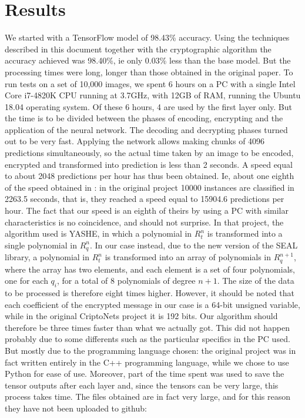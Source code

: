 \section{Results}

We started with a TensorFlow model of 98.43\% accuracy. Using the techniques described in this document together with the cryptographic algorithm the accuracy achieved was 98.40\%, ie only 0.03\% less than the base model. But the processing times were long, longer than those obtained in the original paper. To run tests on a set of 10,000 images, we spent 6 hours on a PC with a single Intel Core i7-4820K CPU running at 3.7GHz, with 12GB of RAM, running the Ubuntu 18.04 operating system. Of these 6 hours, 4 are used by the first layer only. But the time is to be divided between the phases of encoding, encrypting and the application of the neural network. The decoding and decrypting phases turned out to be very fast. Applying the network allows making chunks of 4096 predictions simultaneously, so the actual time taken by an image to be encoded, encrypted and transformed into prediction is less than 2 seconds. A speed equal to about 2048 predictions per hour has thus been obtained. Ie, about one eighth of the speed obtained in \cite{dowlin2016cryptonets}: in the original project 10000 instances are classified in 2263.5 seconds, that is, they reached a speed equal to 15904.6 predictions per hour. The fact that our speed is an eighth of theirs by using a PC with similar characteristics is no coincidence, and should not surprise. In that project, the algorithm used is YASHE, in which a polynomial in $R^n_t$ is transformed into a single polynomial in $R^n_q$. In our case instead, due to the new version of the SEAL library, a polynomial in $R^n_t$ is transformed into an array of polynomials in $R^{n+1}_q$, where the array has two elements, and each element is a set of four polynomials, one for each $q_i$, for a total of 8 polynomials of degree $n+1$. The size of the data to be processed is therefore eight times higher. However, it should be noted that each coefficient of the encrypted message in our case is a 64-bit unsigned variable, while in the original CriptoNets project it is 192 bits. Our algorithm should therefore be three times faster than what we actually got. This did not happen probably due to some differents such as the particular specifics in the PC used. But mostly due to the programming language chosen: the original project was in fact written entirely in the C++ programming language, while we chose to use Python for ease of use. Moreover, part of the time spent was used to save the tensor outputs after each layer and, since the tensors can be very large, this process takes time. The files obtained are in fact very large, and for this reason they have not been uploaded to github:

